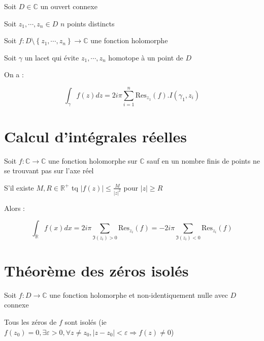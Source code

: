 \documentclass[a4paper,10pt]{report}
\newcommand{\ap}{\rightarrow}
\newcommand{\R}{\mathbb{R}}
\newcommand{\C}{\mathbb{C}}
\newcommand{\so}{\Rightarrow}
\newcommand{\tset}[1]{\left\lbrace #1 \right\rbrace}
\newcommand{\abs}[1]{\left\vert #1 \right\vert}
\newcommand{\Res}{\mbox{Res}}
\begin{document}
Soit $D \in \C$ un ouvert connexe

Soit $z_1, \cdots, z_n \in D$ $n$ points distincts

Soit $f : D\setminus\tset{z_1, \cdots, z_n} \ap \C$ une fonction holomorphe

Soit $\gamma$ un lacet qui évite $z_1, \cdots, z_n$ homotope à un point de $D$

On a :

\[\int_\gamma f(z) dz = 2 i \pi \sum_{i=1}^n \Res_{z_1}(f).I(\gamma_1,z_i)\]

\section{Calcul d'intégrales réelles}

Soit $f : \C \ap \C$ une fonction holomorphe sur $\C$ sauf en un nombre
finis de points ne se trouvant pas sur l'axe réel

S'il existe $M,R \in \R^+$ tq $\abs{f(z)} \leq \frac{M}{\abs{z}^2}$ pour
$\abs{z} \geq R$

Alors :

\[\int_\R f(x) dx = 2 i \pi \sum_{\Im(z_i) > 0} \Res_{z_i}(f) = - 2 i \pi
\sum_{\Im(z_i) < 0} \Res_{z_i}(f) \]

\section{Théorème des zéros isolés}

Soit $f: D \ap \C$ une fonction holomorphe et non-identiquement nulle avec
$D$ connexe

Tous les zéros de $f$ sont isolés (ie $f(z_0) = 0, \exists \varepsilon >
0, \forall z \neq z_0, \abs{z - z_0} < \varepsilon \so f(z) \neq 0$)
\end{document}
